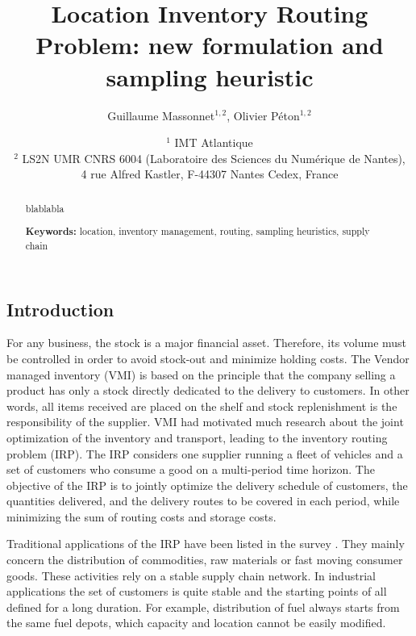 \documentclass[a4paper,10pt]{article}
\title{Location Inventory Routing Problem: new formulation and sampling heuristic}
\author{Guillaume Massonnet$^{1,2}$, Olivier P\'eton$^{1,2}$}
\date{$^1$ IMT Atlantique\\ 
	$^2$ LS2N UMR CNRS 6004 (Laboratoire des Sciences du Numérique de Nantes), \\ 4 rue Alfred Kastler, F-44307 Nantes Cedex, France}
\begin{document}
	
\maketitle


\begin{abstract}
	blablabla
	
	
\textbf{Keywords:}		location, inventory management, routing, sampling heuristics, supply chain
	
\end{abstract}




\modulolinenumbers[5]
\linenumbers
\begin{linenumbers}


\section{Introduction}

For any business, the stock is a major financial asset. 
Therefore, its volume must be controlled in order to avoid stock-out and minimize holding costs. 
The Vendor managed inventory (VMI) is based on the principle that the company selling a product has only a stock directly dedicated to the delivery to customers. In other words, all items received are placed on the shelf and stock replenishment is the responsibility of the supplier. VMI had motivated much research about the joint optimization of the inventory and transport, leading to the inventory routing problem (IRP). The IRP considers one supplier running a fleet of vehicles and a set of customers who consume a good on a multi-period time horizon. The objective of the IRP is to jointly optimize the delivery schedule of customers, the quantities delivered, and the delivery routes to be covered in each period, while minimizing the sum of routing costs and storage costs.

Traditional applications of the IRP have been listed in the survey \cite{Coelho2014}. They mainly concern the distribution of commodities, raw materials or fast moving consumer goods. These activities rely on a stable supply chain network. 
In industrial applications the set of customers is quite stable and the starting points of all defined for a long duration.
For example, distribution of fuel always starts from the same fuel depots, which capacity and location cannot be easily modified. 


\end{linenumbers}
\end{document}
